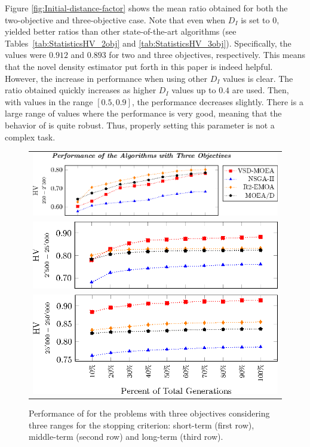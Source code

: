 Figure \ref{fig:Initial-distance-factor} shows the mean \HV{} ratio obtained for both the two-objective and three-objective case.
%
Note that even when $D_I$ is set to $0$, \VSDMOEA{} yielded better \HV{} ratios than other state-of-the-art algorithms (see Tables~\ref{tab:StatisticsHV_2obj} and \ref{tab:StatisticsHV_3obj}).
%
Specifically, the values were $0.912$ and $0.893$ for two and three objectives, respectively.
%
This means that the novel density estimator put forth in this paper is indeed helpful.
%
However, the increase in performance when using other $D_I$ values is clear.
%
The \HV{} ratio obtained quickly increases as higher $D_I$ values up to $0.4$ are used.
%
Then, with values in the range $[0.5, 0.9]$, the performance decreases slightly.
%
There is a large range of values where the performance is very good, meaning that 
the behavior of \VSDMOEA{} is quite robust.
%
Thus, properly setting this parameter is not a complex task.
%
\begin{figure}[t]
\centering
\begin{tabular}{l}
 \includegraphics[scale=0.6]{Images/Time_tikz-figure3.eps}\\[0cm]%
 \includegraphics[scale=0.6]{Images/Time_tikz-figure4.eps}\\[0cm]%
 \includegraphics[scale=0.6]{Images/Time_tikz-figure5.eps}
\end{tabular}
\caption{Performance of \MOEAS{} for the problems with three objectives considering three ranges for the stopping criterion: short-term (first row), middle-term (second row) and long-term (third row).}\label{fig:Performance_time_3obj}
\end{figure}

